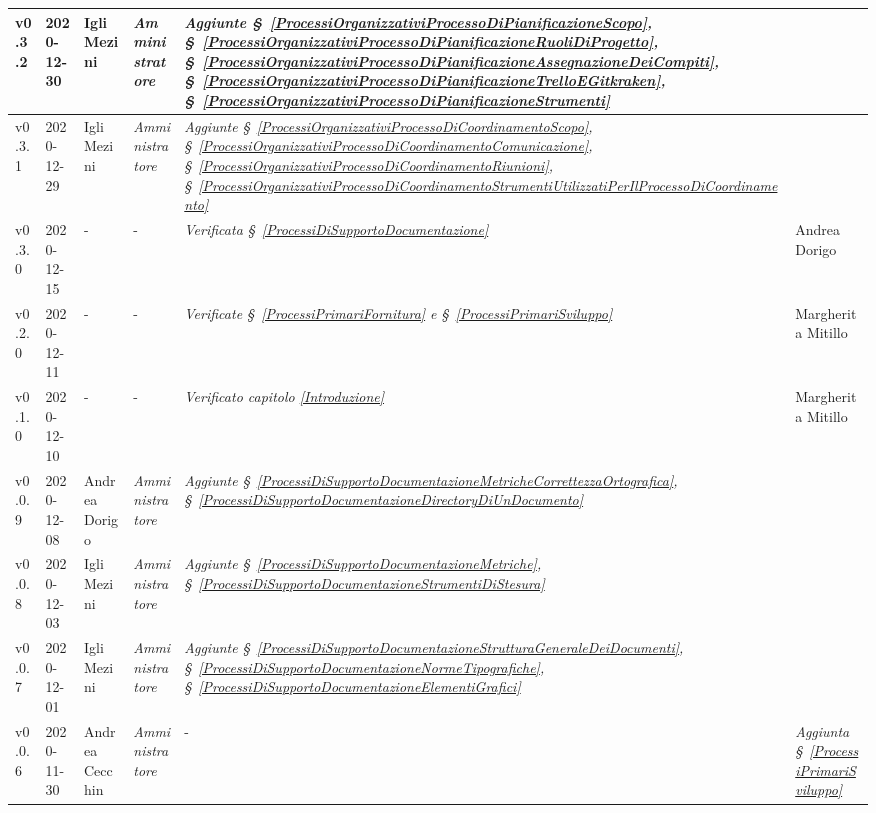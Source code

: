{\begin{center}
\begin{longtable}[c]{|p{2cm-1\tabcolsep}|p{2cm}|p{3cm-2\tabcolsep}|p{3cm-1.5\tabcolsep}|p{}|p{3cm-2\tabcolsep}|}
		\hline
		\centering v0.3.2 & 2020-12-30 & Igli Mezini & \centering \textit{Amministratore}  & \textit{Aggiunte  \S~\ref{ProcessiOrganizzativiProcessoDiPianificazioneScopo}, \S~\ref{ProcessiOrganizzativiProcessoDiPianificazioneRuoliDiProgetto}, \S~\ref{ProcessiOrganizzativiProcessoDiPianificazioneAssegnazioneDeiCompiti}, \S~\ref{ProcessiOrganizzativiProcessoDiPianificazioneTrelloEGitkraken}, \S~\ref{ProcessiOrganizzativiProcessoDiPianificazioneStrumenti} } & \makecell[c]{-} \\
		\hline
		\centering v0.3.1 & 2020-12-29 & Igli Mezini & \centering \textit{Amministratore} &  \textit{Aggiunte  \S~\ref{ProcessiOrganizzativiProcessoDiCoordinamentoScopo}, \S~\ref{ProcessiOrganizzativiProcessoDiCoordinamentoComunicazione}, \S~\ref{ProcessiOrganizzativiProcessoDiCoordinamentoRiunioni}, \S~\ref{ProcessiOrganizzativiProcessoDiCoordinamentoStrumentiUtilizzatiPerIlProcessoDiCoordinamento} } & \makecell[c]{-} \\
		\hline
		\centering v0.3.0 & 2020-12-15 & \centering - & \centering -  & 
		\textit{Verificata  \S~\ref{ProcessiDiSupportoDocumentazione}} & Andrea Dorigo \\
		\hline
		\centering v0.2.0 & 2020-12-11 & \centering - & \centering -  & \textit{Verificate \S~\ref{ProcessiPrimariFornitura} e \S~\ref{ProcessiPrimariSviluppo} } & Margherita Mitillo \\
		\hline
		\centering v0.1.0 & 2020-12-10 & \centering - & \centering - & \textit{Verificato capitolo \ref{Introduzione}} & Margherita Mitillo  \\
		\hline
		\centering v0.0.9 & 2020-12-08 & Andrea Dorigo & \centering \textit{Amministratore} & \textit{Aggiunte  \S~\ref{ProcessiDiSupportoDocumentazioneMetricheCorrettezzaOrtografica}, \S~\ref{ProcessiDiSupportoDocumentazioneDirectoryDiUnDocumento}} & \makecell[c]{-}\\
		\hline
		\centering v0.0.8 & 2020-12-03 & Igli Mezini & \centering \textit{Amministratore} &  \textit{Aggiunte  \S~\ref{ProcessiDiSupportoDocumentazioneMetriche}, \S~\ref{ProcessiDiSupportoDocumentazioneStrumentiDiStesura}}&  \makecell[c]{-}\\
		\hline
		\centering v0.0.7 & 2020-12-01 & Igli Mezini & \centering \textit{Amministratore} &  \textit{Aggiunte  \S~\ref{ProcessiDiSupportoDocumentazioneStrutturaGeneraleDeiDocumenti}, \S~\ref{ProcessiDiSupportoDocumentazioneNormeTipografiche}, \S~\ref{ProcessiDiSupportoDocumentazioneElementiGrafici}} & \makecell[c]{-} \\
		\hline
		\centering v0.0.6 & 2020-11-30 & Andrea Cecchin & \centering \textit{Amministratore} & \centering - & \textit{Aggiunta  \S~\ref{ProcessiPrimariSviluppo}} \makecell[c]{-} \\

\end{longtable}
\end{center}}
